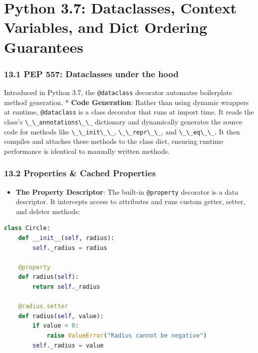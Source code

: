 \hypertarget{python-3.7-dataclasses-context-variables-and-dict-ordering-guarantees}{%
\chapter{Python 3.7: Dataclasses, Context Variables, and Dict Ordering
Guarantees}\label{python-3.7-dataclasses-context-variables-and-dict-ordering-guarantees}}

\hypertarget{pep-557-dataclasses-under-the-hood}{%
\subsection{13.1 PEP 557: Dataclasses under the
hood}\label{pep-557-dataclasses-under-the-hood}}

Introduced in Python 3.7, the \passthrough{\lstinline!@dataclass!}
decorator automates boilerplate method generation. * \textbf{Code
Generation}: Rather than using dynamic wrappers at runtime,
\passthrough{\lstinline!@dataclass!} is a class decorator that runs at
import time. It reads the class's
\passthrough{\lstinline!\_\_annotations\_\_!} dictionary and dynamically
generates the source code for methods like
\passthrough{\lstinline!\_\_init\_\_!},
\passthrough{\lstinline!\_\_repr\_\_!}, and
\passthrough{\lstinline!\_\_eq\_\_!}. It then compiles and attaches
these methods to the class dict, ensuring runtime performance is
identical to manually written methods.

\hypertarget{properties-cached-properties}{%
\subsection{13.2 Properties \& Cached
Properties}\label{properties-cached-properties}}

\begin{itemize}
\tightlist
\item
  \textbf{The Property Descriptor}: The built-in
  \passthrough{\lstinline!@property!} decorator is a data descriptor. It
  intercepts access to attributes and runs custom getter, setter, and
  deleter methods:
\end{itemize}

\begin{lstlisting}[language=Python]
class Circle:
    def __init__(self, radius):
        self._radius = radius

    @property
    def radius(self):
        return self._radius

    @radius.setter
    def radius(self, value):
        if value < 0:
            raise ValueError("Radius cannot be negative")
        self._radius = value
\end{lstlisting}

